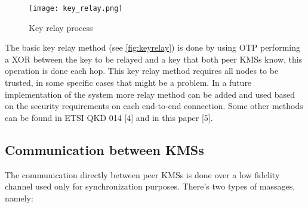\begin{refsection}
\vspace{5mm}

\begin{figure}[H]
	\centering
	\texttt{[image: key\_relay.png]}
	\caption{Key relay process}
	\label{fig:keyrelay}
\end{figure}

The basic key relay method (see \autoref{fig:keyrelay}) is done by using \ac{OTP} performing a XOR between the key to be relayed and a key that both peer \ac{KMS}s know, this operation is done each hop. This key relay method requires all nodes to be trusted,  in some specific cases that might be a problem. In a future implementation of the system more relay method can be added and used based on the security requirements on each end-to-end connection. Some other methods can be found in ETSI QKD 014 [4] and in this paper [5].

\subsection{Communication between KMSs}
\label{kms_com}

The communication directly between peer \ac{KMS}s is done over a low fidelity channel used only for synchronization purposes. There's two types of massages, namely:


\end{refsection}
